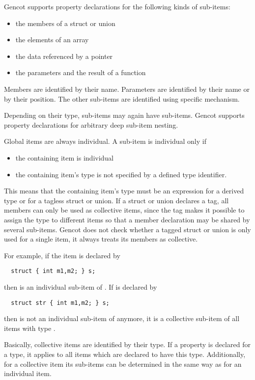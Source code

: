 Gencot supports property declarations for the following kinds of sub-items:
\begin{itemize}
\item the members of a struct or union
\item the elements of an array
\item the data referenced by a pointer
\item the parameters and the result of a function
\end{itemize}
Members are identified by their name. Parameters are identified by their name or by their position. The other
sub-items are identified using specific mechanism.

Depending on their type, sub-items may again have sub-items. Gencot supports property declarations for arbitrary
deep sub-item nesting.

Global items are always individual. A sub-item is individual only if
\begin{itemize}
\item the containing item is individual
\item the containing item's type is not specified by a defined type identifier.
\end{itemize}
This means that the containing item's type must be an expression for a derived type or for a tagless struct or union.
If a struct or union declares a tag, all members can only be used as collective items, since the tag makes it possible
to assign the type to different items so that a member declaration may be shared by several sub-items. Gencot does
not check whether a tagged struct or union is only used for a single item, it always treats its members as collective.

For example, if the item  is declared by
\begin{verbatim}
  struct { int m1,m2; } s;
\end{verbatim}
then  is an individual sub-item of . If  is declared by
\begin{verbatim}
  struct str { int m1,m2; } s;
\end{verbatim}
then  is not an individual sub-item of  anymore, it is a collective sub-item of all items with
type .

Basically, collective items are identified by their type. If a property is declared for a type, it applies to 
all items which are declared to have this type. Additionally, for a collective item its sub-items can be determined
in the same way as for an individual item. 

